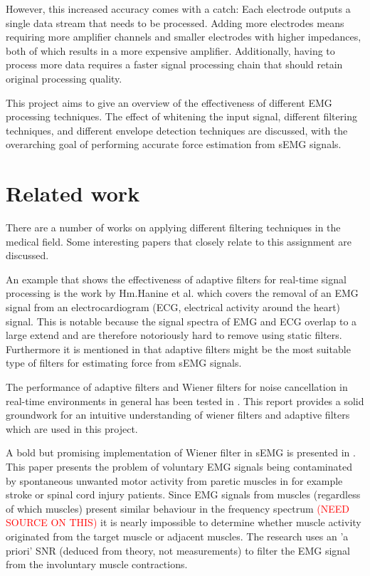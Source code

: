 However, this increased accuracy comes with a catch: Each electrode outputs a single data stream that needs to be processed. Adding more electrodes means requiring more amplifier channels and smaller electrodes with higher impedances, both of which results in a more expensive amplifier. Additionally, having to process more data requires a faster signal processing chain that should retain original processing quality.


This project aims to give an overview of the effectiveness of different EMG processing techniques. The effect of whitening the input signal, different filtering techniques, and different envelope detection techniques are discussed, with the overarching goal of performing accurate force estimation from sEMG signals.

\section{Related work}
There are a number of works on applying different filtering techniques in the medical field. Some interesting papers that closely relate to this assignment are discussed.

An example that shows the effectiveness of adaptive filters for real-time signal processing is the work by Hm.Hanine et al. \cite{adaptive_filter_emg_noise_cancellation_ecg} which covers the removal of an EMG signal from an electrocardiogram (ECG, electrical activity around the heart) signal. This is notable because the signal spectra of EMG and ECG overlap to a large extend and are therefore notoriously hard to remove using static filters. Furthermore it is mentioned in \cite{influence_semg_amplitude_estimation_technique_on_emg_force_relationship} that adaptive filters might be the most suitable type of filters for estimating force from sEMG signals.

The performance of adaptive filters and Wiener filters for noise cancellation in real-time environments in general has been tested in \cite{wiener_vs_adaptive_realtime_noisecancellation}. This report provides a solid groundwork for an intuitive understanding of wiener filters and adaptive filters which are used in this project.

A bold but promising implementation of Wiener filter in sEMG is presented in \cite{wiener_filter_a_priori_semg}. This paper presents the problem of voluntary EMG signals being contaminated by spontaneous unwanted motor activity from paretic muscles in for example stroke or spinal cord injury patients. Since EMG signals from muscles (regardless of which muscles) present similar behaviour in the frequency spectrum \textcolor{red}{(NEED SOURCE ON THIS)} it is nearly impossible to determine whether muscle activity originated from the target muscle or adjacent muscles. The research uses an 'a priori' SNR (deduced from theory, not measurements) to filter the EMG signal from the involuntary muscle contractions. 


